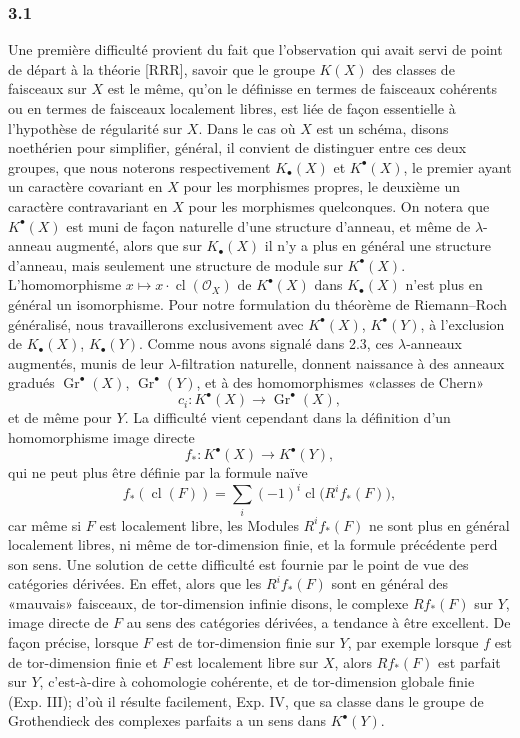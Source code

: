 \documentclass[11pt]{article}
\newcommand{\Gr}{\operatorname{Gr}}
\newcommand{\cl}{\operatorname{cl}}
\begin{document}
\subsubsection*{3.1}
Une première difficulté provient du fait que l'observation qui avait servi de point de départ à la théorie [RRR], savoir que le groupe $K(X)$ des classes de faisceaux sur $X$ est le même, qu'on le définisse en termes de faisceaux cohérents ou en termes de faisceaux localement libres, est liée de façon essentielle à l'hypothèse de régularité sur $X$. Dans le cas où $X$ est un schéma, disons noethérien pour simplifier, général, il convient de distinguer entre ces deux groupes, que nous noterons respectivement $K_\bullet(X)$ et $K^\bullet(X)$, le premier ayant un caractère covariant en $X$ pour les morphismes propres, le deuxième un caractère contravariant en $X$ pour les morphismes quelconques. On notera que $K^\bullet(X)$ est muni de façon naturelle d'une structure d'anneau, et même de $\lambda$-anneau augmenté, alors que sur $K_\bullet(X)$ il n'y a plus en général une structure d'anneau, mais seulement une structure de module sur $K^\bullet(X)$. L'homomorphisme $x\mapsto x\cdot\cl(\mathcal O_X)$ de $K^\bullet(X)$ dans $K_\bullet(X)$ n'est plus en général un isomorphisme. Pour notre formulation du théorème de Riemann--Roch généralisé, nous travaillerons exclusivement avec $K^\bullet(X)$, $K^\bullet(Y)$, à l'exclusion de $K_\bullet(X)$, $K_\bullet(Y)$. Comme nous avons signalé dans 2.3, ces $\lambda$-anneaux augmentés, munis de leur $\lambda$-filtration naturelle, donnent naissance à des anneaux gradués $\Gr^\bullet(X)$, $\Gr^\bullet(Y)$, et à des homomorphismes «classes de Chern»
\[
c_i:K^\bullet(X)\longrightarrow \Gr^\bullet(X),
\]
et de même pour $Y$. La difficulté vient cependant dans la définition d'un homomorphisme image directe
\begin{equation}\tag{3.1}
f_*:K^\bullet(X)\longrightarrow K^\bullet(Y),
\end{equation}
qui ne peut plus être définie par la formule naïve
\[
f_*(\cl(F))=\sum_i(-1)^i\cl\bigl(R^if_*(F)\bigr),
\]
car même si $F$ est localement libre, les Modules $R^if_*(F)$ ne sont plus en général localement libres, ni même de tor-dimension finie, et la formule précédente perd son sens. Une solution de cette difficulté est fournie par le point de vue des catégories dérivées. En effet, alors que les $R^if_*(F)$ sont en général des «mauvais» faisceaux, de tor-dimension infinie disons, le complexe $Rf_*(F)$ sur $Y$, image directe de $F$ au sens des catégories dérivées, a tendance à être excellent. De façon précise, lorsque $F$ est de tor-dimension finie sur $Y$, par exemple lorsque $f$ est de tor-dimension finie et $F$ est localement libre sur $X$, alors $Rf_*(F)$ est parfait sur $Y$, c'est-à-dire à cohomologie cohérente, et de tor-dimension globale finie (Exp. III); d'où il résulte facilement, Exp. IV, que sa classe dans le groupe de Grothendieck des complexes parfaits a un sens dans $K^\bullet(Y)$.
\end{document}
